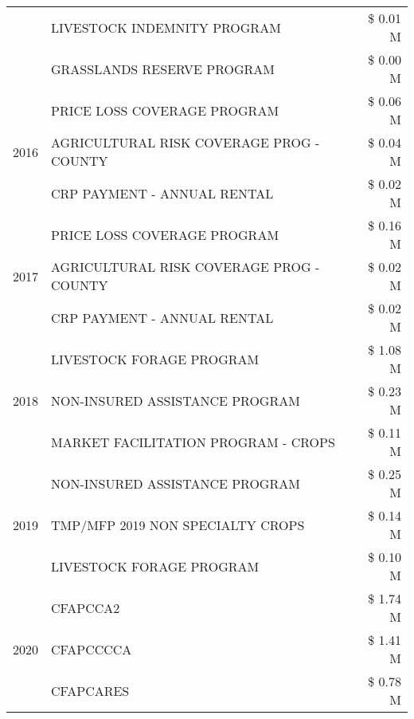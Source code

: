 \begin{tabular}{llr}
 & LIVESTOCK INDEMNITY PROGRAM & \$ 0.01 M \\
 & GRASSLANDS RESERVE PROGRAM & \$ 0.00 M \\
\cline{1-3}
\multirow[t]{3}{*}{2016} & PRICE LOSS COVERAGE PROGRAM & \$ 0.06 M \\
 & AGRICULTURAL RISK COVERAGE PROG - COUNTY & \$ 0.04 M \\
 & CRP PAYMENT - ANNUAL RENTAL & \$ 0.02 M \\
\cline{1-3}
\multirow[t]{3}{*}{2017} & PRICE LOSS COVERAGE PROGRAM & \$ 0.16 M \\
 & AGRICULTURAL RISK COVERAGE PROG - COUNTY & \$ 0.02 M \\
 & CRP PAYMENT - ANNUAL RENTAL & \$ 0.02 M \\
\cline{1-3}
\multirow[t]{3}{*}{2018} & LIVESTOCK FORAGE PROGRAM & \$ 1.08 M \\
 & NON-INSURED ASSISTANCE PROGRAM & \$ 0.23 M \\
 & MARKET FACILITATION PROGRAM - CROPS & \$ 0.11 M \\
\cline{1-3}
\multirow[t]{3}{*}{2019} & NON-INSURED ASSISTANCE PROGRAM & \$ 0.25 M \\
 & TMP/MFP 2019 NON SPECIALTY CROPS & \$ 0.14 M \\
 & LIVESTOCK FORAGE PROGRAM & \$ 0.10 M \\
\cline{1-3}
\multirow[t]{3}{*}{2020} & CFAPCCA2 & \$ 1.74 M \\
 & CFAPCCCCA & \$ 1.41 M \\
 & CFAPCARES & \$ 0.78 M \\
\cline{1-3}
\bottomrule
\end{tabular}
